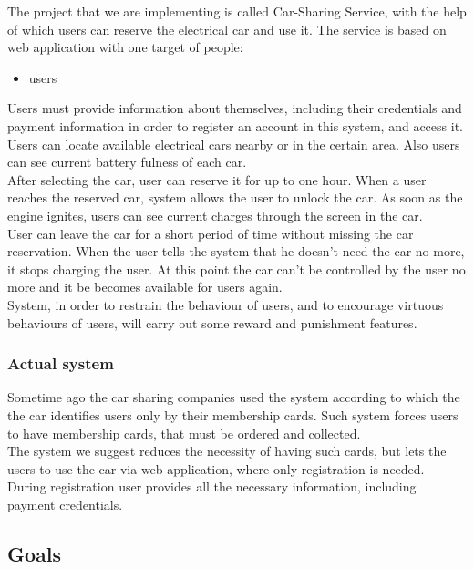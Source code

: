 \documentclass[12pt, letterpaper]{article}
\begin{document}
The project that we are implementing is called Car-Sharing Service, with the help of
which users can reserve the electrical car and use it. The service is based on web
application with one target of people: \\
\begin{itemize}
	\item users \\
\end{itemize}
Users must provide information about themselves, including their credentials and
payment information in order to register an account in this system, and access it.
Users can locate available electrical cars nearby or in the certain area. Also users can
see current battery fulness of each car. \\
After selecting the car, user can reserve it for up to one hour. When a user reaches the
reserved car, system allows the user to unlock the car. As soon as the engine ignites,
users can see current charges through the screen in the car. \\
User can leave the car for a short period of time without missing the car reservation.
When the user tells the system that he doesn’t need the car no more, it stops charging
the user. At this point the car can’t be controlled by the user no more and it be
becomes available for users again. \\
System, in order to restrain the behaviour of users, and to encourage virtuous
behaviours of users, will carry out some reward and punishment features.

\subsubsection{Actual system}

Sometime ago the car sharing companies used the system according to which the the
car identifies users only by their membership cards. Such system forces users to have
membership cards, that must be ordered and collected. \\
The system we suggest reduces the necessity of having such cards, but lets the users to
use the car via web application, where only registration is needed. \\
During registration user provides all the necessary information, including payment
credentials.

\subsection{Goals}
\end{document}
